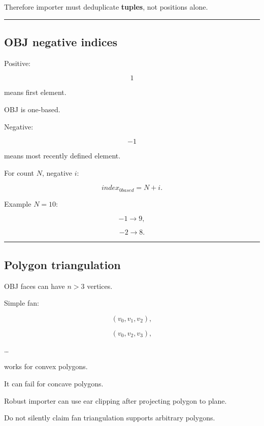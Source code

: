 Therefore importer must deduplicate \textbf{tuples}, not positions alone.

\begin{center}\rule{0.5\linewidth}{0.5pt}\end{center}

\subsection{OBJ negative indices}\label{04-visual-computing-ii-ch041-obj-negative-indices}

\hypertarget{04-visual-computing-ii-ch041-obj-negative-indices}{}

Positive:

\[
1
\]

means first element.

OBJ is one-based.

Negative:

\[
-1
\]

means most recently defined element.

For count \(N\), negative \(i\):

\[
\boxed{
index_{0based}
=
N+i.
}
\]

Example \(N=10\):

\[
-1\rightarrow9,
\]

\[
-2\rightarrow8.
\]

\begin{center}\rule{0.5\linewidth}{0.5pt}\end{center}

\subsection{Polygon triangulation}\label{04-visual-computing-ii-ch041-polygon-triangulation}

\hypertarget{04-visual-computing-ii-ch041-polygon-triangulation}{}

OBJ faces can have \(n>3\) vertices.

Simple fan:

\[
(v_0,v_1,v_2),
\]

\[
(v_0,v_2,v_3),
\]

\ldots{}

works for convex polygons.

It can fail for concave polygons.

Robust importer can use ear clipping after projecting polygon to plane.

Do not silently claim fan triangulation supports arbitrary polygons.

